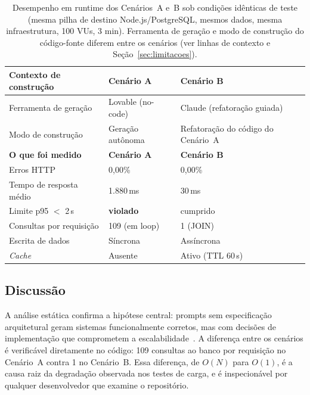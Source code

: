 \documentclass[sigconf]{acmart}
\begin{document}
\begin{table}[t]
  \caption{Desempenho em runtime dos Cenários~A e~B sob condições idênticas de teste
           (mesma pilha de destino Node.js/PostgreSQL, mesmos dados, mesma infraestrutura,
           100 VUs, 3 min). Ferramenta de geração e modo de construção do código-fonte
           diferem entre os cenários (ver linhas de contexto e Seção~\ref{sec:limitacoes}).}
  \label{tab:resultados}
  \small
  \begin{tabular}{lp{2.0cm}p{2.0cm}}
    \toprule
    \textbf{Contexto de construção} & \textbf{Cenário A} & \textbf{Cenário B} \\
    \midrule
    Ferramenta de geração    & Lovable (no-code) & Claude (refatoração guiada) \\
    Modo de construção       & Geração autônoma & Refatoração do código do Cenário~A \\
    \midrule
    \textbf{O que foi medido} & \textbf{Cenário A} & \textbf{Cenário B} \\
    \midrule
    Erros HTTP               & 0,00\%      & 0,00\%          \\
    Tempo de resposta médio  & 1.880\,ms   & 30\,ms          \\
    Limite p95 $<$ 2\,s      & \textbf{violado} & cumprido   \\
    \midrule
    Consultas por requisição & 109 (em loop) & 1 (JOIN)      \\
    Escrita de dados         & Síncrona    & Assíncrona      \\
    \textit{Cache}           & Ausente     & Ativo (TTL 60\,s) \\
    \bottomrule
  \end{tabular}
\end{table}

\subsection{Discussão}

A análise estática confirma a hipótese central: prompts sem especificação
arquitetural geram sistemas funcionalmente corretos, mas com decisões de
implementação que comprometem a escalabilidade~\cite{Shypula2023,Bass2021}. A
diferença entre os cenários é verificável diretamente no código: 109 consultas
ao banco por requisição no Cenário~A contra 1 no Cenário~B. Essa diferença, de
$O(N)$ para $O(1)$, é a causa raiz da degradação observada nos testes de carga,
e é inspecionável por qualquer desenvolvedor que examine o repositório.
\end{document}
